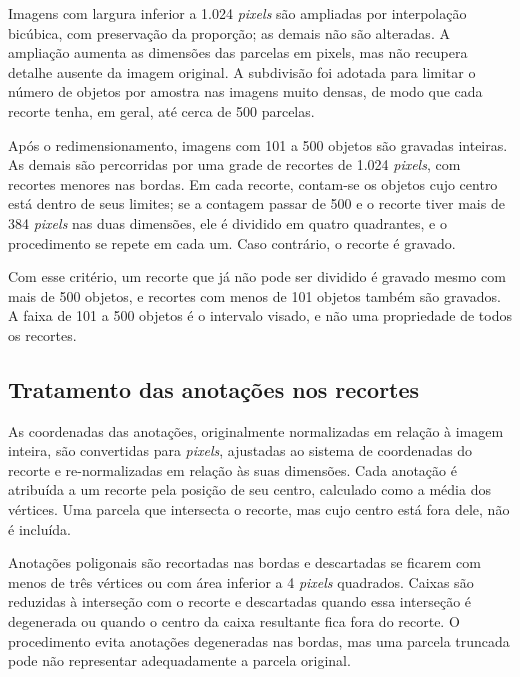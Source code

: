 Imagens com largura inferior a 1.024 \textit{pixels} s\~ao ampliadas por interpola\c{c}\~ao bic\'ubica, com preserva\c{c}\~ao da propor\c{c}\~ao; as demais n\~ao s\~ao alteradas. A amplia\c{c}\~ao aumenta as dimens\~oes das parcelas em pixels, mas n\~ao recupera detalhe ausente da imagem original. A subdivis\~ao foi adotada para limitar o n\'umero de objetos por amostra nas imagens muito densas, de modo que cada recorte tenha, em geral, at\'e cerca de 500 parcelas.

Ap\'os o redimensionamento, imagens com 101 a 500 objetos s\~ao gravadas inteiras. As demais s\~ao percorridas por uma grade de recortes de 1.024 \textit{pixels}, com recortes menores nas bordas. Em cada recorte, contam-se os objetos cujo centro est\'a dentro de seus limites; se a contagem passar de 500 e o recorte tiver mais de 384 \textit{pixels} nas duas dimens\~oes, ele \'e dividido em quatro quadrantes, e o procedimento se repete em cada um. Caso contr\'ario, o recorte \'e gravado.

Com esse crit\'erio, um recorte que j\'a n\~ao pode ser dividido \'e gravado mesmo com mais de 500 objetos, e recortes com menos de 101 objetos tamb\'em s\~ao gravados. A faixa de 101 a 500 objetos \'e o intervalo visado, e n\~ao uma propriedade de todos os recortes.

\subsection{Tratamento das anota\c{c}\~oes nos recortes}
\label{sec:tratamento-anotacoes-recortes}

As coordenadas das anota\c{c}\~oes, originalmente normalizadas em rela\c{c}\~ao \`a imagem inteira, s\~ao convertidas para \textit{pixels}, ajustadas ao sistema de coordenadas do recorte e re-normalizadas em rela\c{c}\~ao \`as suas dimens\~oes. Cada anota\c{c}\~ao \'e atribu\'ida a um recorte pela posi\c{c}\~ao de seu centro, calculado como a m\'edia dos v\'ertices. Uma parcela que intersecta o recorte, mas cujo centro est\'a fora dele, n\~ao \'e inclu\'ida.

Anota\c{c}\~oes poligonais s\~ao recortadas nas bordas e descartadas se ficarem com menos de tr\^es v\'ertices ou com \'area inferior a 4 \textit{pixels} quadrados. Caixas s\~ao reduzidas \`a interse\c{c}\~ao com o recorte e descartadas quando essa interse\c{c}\~ao \'e degenerada ou quando o centro da caixa resultante fica fora do recorte. O procedimento evita anota\c{c}\~oes degeneradas nas bordas, mas uma parcela truncada pode n\~ao representar adequadamente a parcela original.

